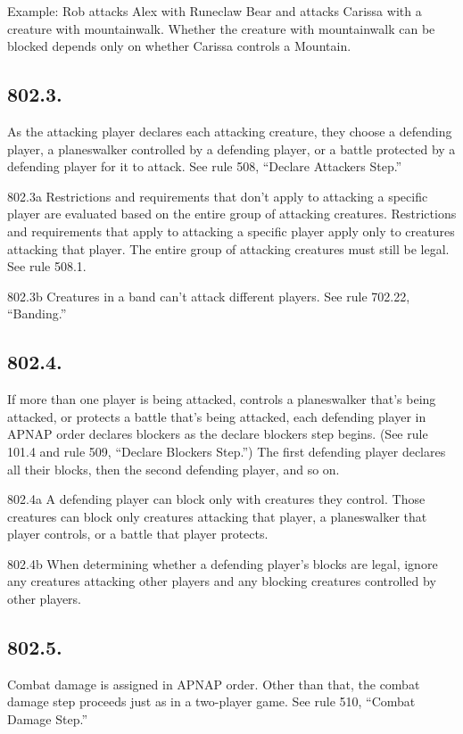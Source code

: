 Example: Rob attacks Alex with Runeclaw Bear and attacks Carissa with a creature with mountainwalk. Whether the creature with mountainwalk can be blocked depends only on whether Carissa controls a Mountain.

\subsection*{802.3.}
As the attacking player declares each attacking creature, they choose a defending player, a planeswalker controlled by a defending player, or a battle protected by a defending player for it to attack. See rule 508, “Declare Attackers Step.”

802.3a Restrictions and requirements that don’t apply to attacking a specific player are evaluated based on the entire group of attacking creatures. Restrictions and requirements that apply to attacking a specific player apply only to creatures attacking that player. The entire group of attacking creatures must still be legal. See rule 508.1.

802.3b Creatures in a band can’t attack different players. See rule 702.22, “Banding.”

\subsection*{802.4.}
If more than one player is being attacked, controls a planeswalker that’s being attacked, or protects a battle that’s being attacked, each defending player in APNAP order declares blockers as the declare blockers step begins. (See rule 101.4 and rule 509, “Declare Blockers Step.”) The first defending player declares all their blocks, then the second defending player, and so on.

802.4a A defending player can block only with creatures they control. Those creatures can block only creatures attacking that player, a planeswalker that player controls, or a battle that player protects.

802.4b When determining whether a defending player’s blocks are legal, ignore any creatures attacking other players and any blocking creatures controlled by other players.

\subsection*{802.5.}
Combat damage is assigned in APNAP order. Other than that, the combat damage step proceeds just as in a two-player game. See rule 510, “Combat Damage Step.”

